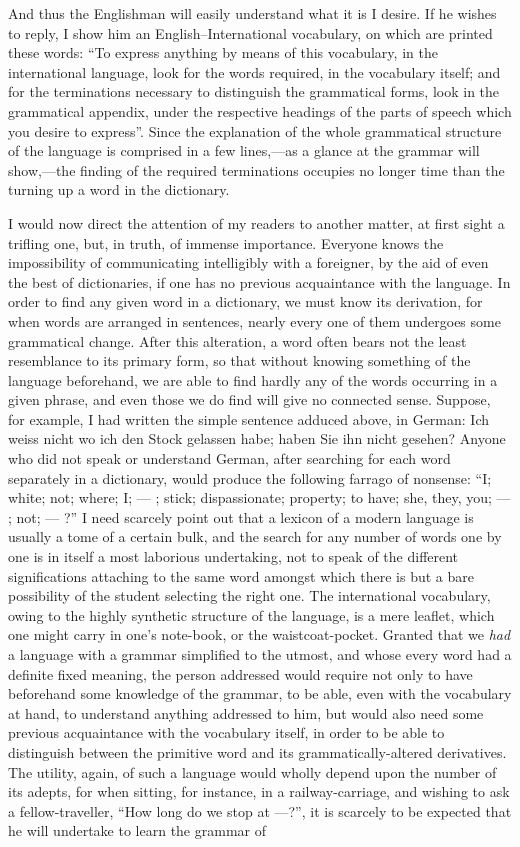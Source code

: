 And thus the Englishman will easily understand what it is I desire. If he wishes to reply, I show him an English--International vocabulary, on which are printed these words: “To express anything by means of this vocabulary, in the international language, look for the words required, in the vocabulary itself; and for the terminations necessary to distinguish the grammatical forms, look in the grammatical appendix, under the respective headings of the parts of speech which you desire to express”. Since the explanation of the whole grammatical structure of the language is comprised in a few lines,---as a glance at the grammar will show,---the finding of the required terminations occupies no longer time than the turning up a word in the dictionary.

I would now direct the attention of my readers to another matter, at first sight a trifling one, but, in truth, of immense importance. Everyone knows the impossibility of communicating intelligibly with a foreigner, by the aid of even the best of dictionaries, if one has no previous acquaintance with the language. In order to find any given word in a dictionary, we must know its derivation, for when words are arranged in sentences, nearly every one of them undergoes some grammatical change. After this alteration, a word often bears not the least resemblance to its primary form, so that without knowing something of the language beforehand, we are able to find hardly any of the words occurring in a given phrase, and even those we do find will give no connected sense. Suppose, for example, I had written the simple sentence adduced above, in German: \glqq Ich weiss nicht wo ich den Stock gelassen habe; haben Sie ihn nicht gesehen?\grqq{} Anyone who did not speak or understand German, after searching for each word separately in a dictionary, would produce the following farrago of nonsense: “I; white; not; where; I; --- ; stick; dispassionate; property; to have; she, they, you; --- ; not; --- ?” I need scarcely point out that a lexicon of a modern language is usually a tome of a certain bulk, and the search for any number of words one by one is in itself a most laborious undertaking, not to speak of the different significations attaching to the same word amongst which there is but a bare possibility of the student selecting the right one. The international vocabulary, owing to the highly synthetic structure of the language, is a mere leaflet, which one might carry in one’s note-book, or the waistcoat-pocket. Granted that we \emph{had} a language with a grammar simplified to the utmost, and whose every word had a definite fixed meaning, the person addressed would require not only to have beforehand some knowledge of the grammar, to be able, even with the vocabulary at hand, to understand anything addressed to him, but would also need some previous acquaintance with the vocabulary itself, in order to be able to distinguish between the primitive word and its grammatically-altered derivatives. The utility, again, of such a language would wholly depend upon the number of its adepts, for when sitting, for instance, in a railway-carriage, and wishing to ask a fellow-traveller, “How long do we stop at ---?”, it is scarcely to be expected that he will undertake to learn the grammar of 